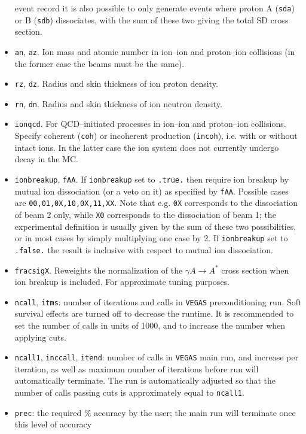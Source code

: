 \documentclass[12pt]{article}
\begin{document}
\begin{itemize}
event record it is also possible to only generate events where proton A (\texttt{sda}) or B (\texttt{sdb}) 
dissociates, with the sum of these two giving the total SD cross section.
\item \texttt{an}, \texttt{az}. Ion mass and atomic number in ion--ion and proton--ion collisions (in the former 
case the beams must be the same).
\item \texttt{rz}, \texttt{dz}. Radius and skin thickness of ion proton density.
\item \texttt{rn}, \texttt{dn}. Radius and skin thickness of ion neutron density.
\item \texttt{ionqcd}. For QCD--initiated processes in ion--ion and proton--ion collisions. Specify coherent 
(\texttt{coh}) or incoherent production (\texttt{incoh}), i.e. with or without intact ions. In the latter case the 
ion system does not currently undergo decay in the MC.
\item \texttt{ionbreakup}, \texttt{fAA}. If \texttt{ionbreakup} set to \texttt{.true.} then require ion breakup by 
mutual ion dissociation (or a veto on it) as specified by \texttt{fAA}. Possible cases are \texttt{00,01,0X,10,0X,11,XX}.
 Note that e.g. \texttt{0X} corresponds to the dissociation of beam 2 only, while \texttt{X0} corresponds to the 
 dissociation of beam 1; the experimental definition is usually given by the sum of these two possibilities, or in 
 most cases by simply multiplying one case by 2. If \texttt{ionbreakup} set to \texttt{.false.} the result is 
 inclusive with respect to mutual ion dissociation.
\item \texttt{fracsigX}. Reweights the normalization of the $\gamma A \to A^*$ cross section when ion breakup is 
included. For approximate tuning purposes.
\item \texttt{ncall}, \texttt{itms}: number of iterations and calls in \texttt{VEGAS} preconditioning run. Soft 
survival effects are turned off to decrease the runtime. It is recommended to set the number of calls in units of 
1000, and to increase the number when applying cuts.
\item \texttt{ncall1}, \texttt{inccall}, \texttt{itend}: number of calls in \texttt{VEGAS} main run, and increase 
per iteration, as well as maximum number of iterations before run will automatically terminate. The run is 
automatically adjusted so that the number of calls passing cuts is approximately equal to \texttt{ncall1}.
\item  \texttt{prec}: the required \% accuracy by the user; the main run will terminate once this level of accuracy 

\end{itemize}
\end{document}
